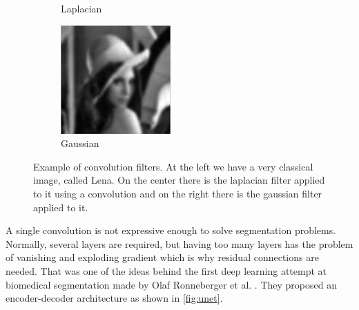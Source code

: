 \begin{figure}[H]
\begin{subfigure}[b]{0.3\textwidth}
    \caption{Laplacian}
  \end{subfigure}
  \hfill
  \begin{subfigure}[b]{0.3\textwidth}
    \includegraphics[width=\textwidth]{imgs/conv/lena3.png}
    \caption{Gaussian}
  \end{subfigure}
    \caption{Example of convolution filters. At the left we have a very classical image, called Lena. On the center there is the laplacian filter applied to it using a convolution and on the right there is the gaussian filter applied to it.}
    \label{fig:conv_ex}
\end{figure}

A single convolution is not expressive enough to solve segmentation problems. Normally, several layers are required, but having too many layers has the problem of vanishing and exploding gradient which is why residual connections are needed. That was one of the ideas behind the first deep learning attempt at biomedical segmentation made by Olaf Ronneberger et al. \cite{unet}. They proposed an encoder-decoder architecture as shown in \autoref{fig:unet}.

